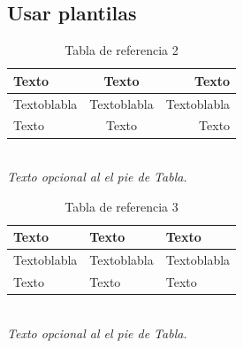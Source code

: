 


\subsection{Usar plantilas}
\begin{minipage}[H]{0.49\textwidth}
    \begin{table}[H]
        \centering
        \begin{measuredfigure}
            \caption{Tabla de referencia 2}
            \begin{tabular}{| l | c | r |} 
            \hline
                \textbf{Texto} & \textbf{Texto} & \textbf{Texto} \\ \hline
                Textoblabla    & Textoblabla   & Textoblabla \\ \hline
                Texto    & Texto   & Texto \\ \hline
            \end{tabular}
        \end{measuredfigure}
        \\ \textit{\scriptsize{Texto opcional al el pie de Tabla.}}
    \end{table}
\end{minipage}
\begin{minipage}[H]{0.49\textwidth}
    \begin{table}[H]
        \centering
        \begin{measuredfigure}
            \caption{Tabla de referencia 3}
            \begin{tabular}{l l l}
            \toprule
                \textbf{Texto} & \textbf{Texto} & \textbf{Texto} \\
                \midrule
                Textoblabla    & Textoblabla   & Textoblabla \\
                Texto    & Texto   & Texto \\
                \bottomrule
            \end{tabular}
        \end{measuredfigure}
        \\ \textit{\scriptsize{Texto opcional al el pie de Tabla.}}
    \end{table}
\end{minipage}

